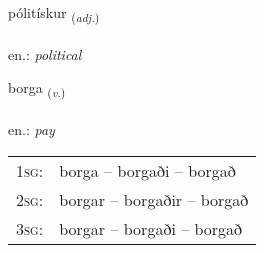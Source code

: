 \documentclass[frontgrid, backgrid]{flacards}\usepackage[]{graphicx}\usepackage[]{xcolor}
\begin{document}
\renewcommand{\flhead}{\vskip5pt \fboxsep=0pt {\small\bfseries\footnotesize Lýsingarorð | Adjective}}
\renewcommand{\fcfoot}{\vskip5pt \fboxsep=0pt \hspace{2pt}{\small\bfseries\footnotesize 1K}}

\renewcommand{\blhead}{\vskip5pt {\small\bfseries\footnotesize Lýsingarorð | Adjective }}
\renewcommand{\bcfoot}{\vskip5pt \hspace{2pt}{\small\bfseries\footnotesize 1K}}


{pólitískur \small{\textsubscript{(\textit{adj.})}} \\[1ex] %
\textphonetic{[pʰouːlɪtʰiskʏr]} \\
en.: \emph{political} \\  [2ex]
\renewcommand*{\arraystretch}{0.8}
}

\renewcommand{\flhead}{\vskip5pt \fboxsep=0pt {\small\bfseries\footnotesize Sagnorð | Verb}}
\renewcommand{\fcfoot}{\vskip5pt \fboxsep=0pt \hspace{2pt}{\small\bfseries\footnotesize 1K}}

\renewcommand{\blhead}{\vskip5pt {\small\bfseries\footnotesize Sagnorð | Verb }}
\renewcommand{\bcfoot}{\vskip5pt \hspace{2pt}{\small\bfseries\footnotesize 1K}}


{borga \small{\textsubscript{(\textit{v.})}} \\[1ex] %
\textphonetic{[pɔrka]} \\
en.: \emph{pay} \\  [2ex]
\renewcommand*{\arraystretch}{0.8}
\begin{tabular}{p{1cm}l}
\textsc{1sg}: & borga -- borgaði -- borgað \\ 
\textsc{2sg}: & borgar -- borgaðir -- borgað \\ 
\textsc{3sg}: & borgar -- borgaði -- borgað \\ 
\end{tabular}
}
\end{document}
